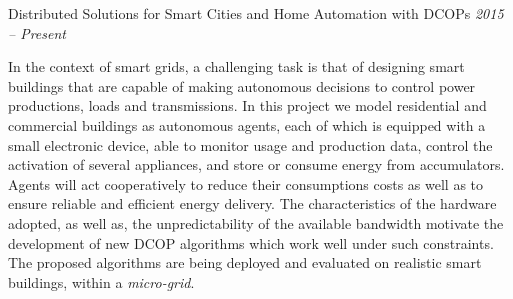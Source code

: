 
\begin{rSubsection}{Distributed Solutions for Smart Cities and Home Automation with DCOPs
}{\em 2015 -- Present}{}{}
\item[]
\begin{figwindownonum}
%
In the context of smart grids, a challenging task is that of designing smart buildings that are capable of making autonomous decisions to control power productions, loads and transmissions. In this project we model residential and commercial buildings as autonomous agents, each of which is equipped with a small electronic device, able to monitor usage and production data, control the activation of several appliances, and store or consume energy from accumulators.
Agents will act cooperatively to reduce their consumptions costs as well as to ensure reliable and efficient energy delivery. 
The characteristics of the hardware adopted, as well as, the unpredictability of the available bandwidth motivate the development of new DCOP algorithms which work well under such constraints. The proposed algorithms are being deployed and evaluated on realistic smart buildings, within a \emph{micro-grid}.
%
\end{figwindownonum}
\end{rSubsection}

